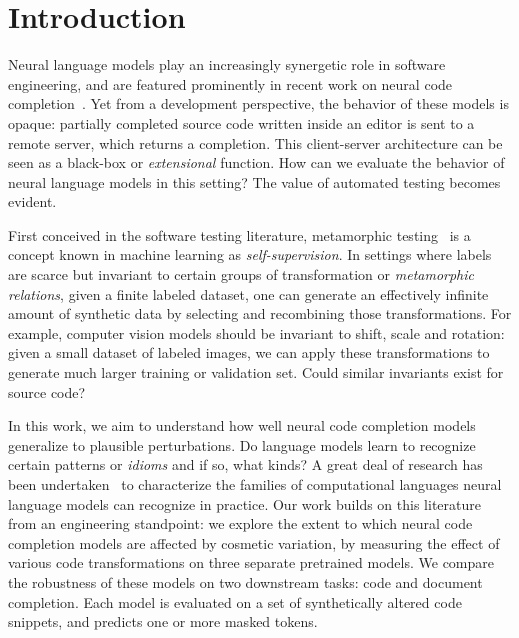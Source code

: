 \documentclass[sigconf,review,anonymous]{acmart}
\begin{document}
  \maketitle

  \section{Introduction}\label{sec:introduction}

  Neural language models play an increasingly synergetic role in software engineering, and are featured prominently in recent work on neural code completion~\cite{chen2021evaluating}. Yet from a development perspective, the behavior of these models is opaque: partially completed source code written inside an editor is sent to a remote server, which returns a completion. This client-server architecture can be seen as a black-box or \textit{extensional} function. How can we evaluate the behavior of neural language models in this setting? The value of automated testing becomes evident.

  First conceived in the software testing literature, metamorphic testing~\cite{chen1995metamorphic} is a concept known in machine learning as \textit{self-supervision}. In settings where labels are scarce but invariant to certain groups of transformation or \textit{metamorphic relations}, given a finite labeled dataset, one can generate an effectively infinite amount of synthetic data by selecting and recombining those transformations. For example, computer vision models should be invariant to shift, scale and rotation: given a small dataset of labeled images, we can apply these transformations to generate much larger training or validation set. Could similar invariants exist for source code?

  In this work, we aim to understand how well neural code completion models generalize to plausible perturbations. Do language models learn to recognize certain patterns or \textit{idioms} and if so, what kinds? A great deal of research has been undertaken~\citep{weiss2018practical, chirkova2020empirical, chen2021evaluating} to characterize the families of computational languages neural language models can recognize in practice. Our work builds on this literature from an engineering standpoint: we explore the extent to which neural code completion models are affected by cosmetic variation, by measuring the effect of various code transformations on three separate pretrained models. We compare the robustness of these models on two downstream tasks: code and document completion. Each model is evaluated on a set of synthetically altered code snippets, and predicts one or more masked tokens.
\end{document}
